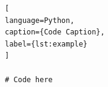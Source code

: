 \begin{lstlisting}[
language=Python,
caption={Code Caption},
label={lst:example}
]

# Code here

\end{lstlisting}
